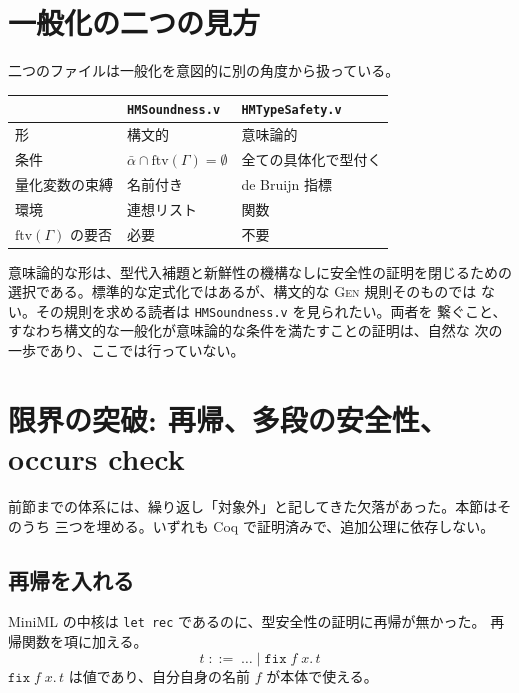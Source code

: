 \documentclass[11pt,a4paper]{ltjsarticle}
\newcommand{\ftv}{\mathrm{ftv}}
\newcommand{\subst}[3]{#1[#2 := #3]}
\newcommand{\step}{\longrightarrow}
\begin{document}
\section{一般化の二つの見方}

二つのファイルは一般化を意図的に別の角度から扱っている。

\begin{center}
\begin{tabular}{lll}
  & \texttt{HMSoundness.v} & \texttt{HMTypeSafety.v} \\
  \hline
  形 & 構文的 & 意味論的 \\
  条件 & $\bar\alpha \cap \ftv(\Gamma) = \emptyset$
       & 全ての具体化で型付く \\
  量化変数の束縛 & 名前付き & de Bruijn 指標 \\
  環境 & 連想リスト & 関数 \\
  $\ftv(\Gamma)$ の要否 & 必要 & 不要 \\
\end{tabular}
\end{center}

意味論的な形は、型代入補題と新鮮性の機構なしに安全性の証明を閉じるための
選択である。標準的な定式化ではあるが、構文的な \textsc{Gen} 規則そのものでは
ない。その規則を求める読者は \texttt{HMSoundness.v} を見られたい。両者を
繋ぐこと、すなわち構文的な一般化が意味論的な条件を満たすことの証明は、自然な
次の一歩であり、ここでは行っていない。

\section{限界の突破: 再帰、多段の安全性、occurs check}
\label{sec:beyond}

前節までの体系には、繰り返し「対象外」と記してきた欠落があった。本節はそのうち
三つを埋める。いずれも Coq で証明済みで、追加公理に依存しない。

\subsection{再帰を入れる}

MiniML の中核は \texttt{let rec} であるのに、型安全性の証明に再帰が無かった。
再帰関数を項に加える。
\[
  t \;::=\; \dots \mid \mathtt{fix}\;f\;x.\,t
\]
$\mathtt{fix}\;f\;x.\,t$ は値であり、自分自身の名前 $f$ が本体で使える。

\end{document}

